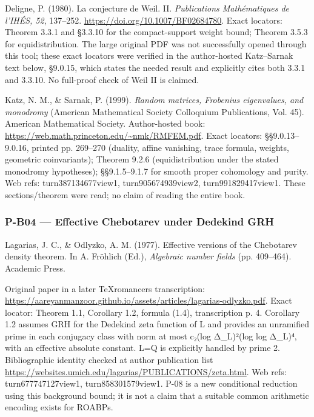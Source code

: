 \documentclass[11pt,a4paper]{article}
\theoremstyle{definition}\newtheorem{definition}{Definition}
\begin{document}
Deligne, P. (1980). La conjecture de Weil. II. \emph{Publications
Mathématiques de l'IHÉS, 52}, 137--252.
\url{https://doi.org/10.1007/BF02684780}. Exact locators: Theorem 3.3.1
and §3.3.10 for the compact-support weight bound; Theorem 3.5.3 for
equidistribution. The large original PDF was not successfully opened
through this tool; these exact locators were verified in the
author-hosted Katz--Sarnak text below, §9.0.15, which states the needed
result and explicitly cites both 3.3.1 and 3.3.10. No full-proof check
of Weil II is claimed.

Katz, N. M., \& Sarnak, P. (1999). \emph{Random matrices, Frobenius
eigenvalues, and monodromy} (American Mathematical Society Colloquium
Publications, Vol. 45). American Mathematical Society. Author-hosted
book: \url{https://web.math.princeton.edu/~nmk/RMFEM.pdf}. Exact
locators: §§9.0.13--9.0.16, printed pp. 269--270 (duality, affine
vanishing, trace formula, weights, geometric coinvariants); Theorem
9.2.6 (equidistribution under the stated monodromy hypotheses);
§§9.1.5--9.1.7 for smooth proper cohomology and purity. Web refs:
turn387134677view1, turn905674939view2, turn991829417view1. These
sections/theorem were read; no claim of reading the entire book.

\subsubsection{P-B04 --- Effective Chebotarev under Dedekind
GRH}\label{p-b04--effective-chebotarev-under-dedekind-grh}

Lagarias, J. C., \& Odlyzko, A. M. (1977). Effective versions of the
Chebotarev density theorem. In A. Fröhlich (Ed.), \emph{Algebraic number
fields} (pp. 409--464). Academic Press.

Original paper in a later TeXromancers transcription:
\url{https://aareyanmanzoor.github.io/assets/articles/lagarias-odlyzko.pdf}.
Exact locator: Theorem 1.1, Corollary 1.2, formula (1.4), transcription
p. 4. Corollary 1.2 assumes GRH for the Dedekind zeta function of L and
provides an unramified prime in each conjugacy class with norm at most
c₂(log Δ\_L)²(log log Δ\_L)⁴, with an effective absolute constant. L=Q
is explicitly handled by prime 2. Bibliographic identity checked at
author publication list
\url{https://websites.umich.edu/lagarias/PUBLICATIONS/zeta.html}. Web
refs: turn677747127view1, turn858301579view1. P-08 is a new conditional
reduction using this background bound; it is not a claim that a suitable
common arithmetic encoding exists for ROABPs.
\end{document}
